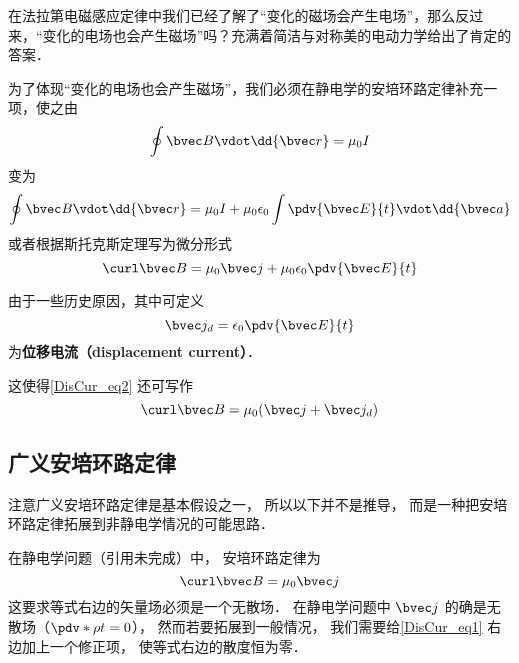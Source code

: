 
\begin{issues}
\issueDraft
\end{issues}


在法拉第电磁感应定律中我们已经了解了“变化的磁场会产生电场”，那么反过来，“变化的电场也会产生磁场”吗？充满着简洁与对称美的电动力学给出了肯定的答案．

为了体现“变化的电场也会产生磁场”，我们必须在静电学的安培环路定律补充一项，使之由
\begin{equation}
\oint \bvec B \vdot \dd{\bvec r} = \mu_0 I
\end{equation}
变为
\begin{equation}
\oint \bvec B \vdot \dd{\bvec r} = \mu_0 I + \mu_0 \epsilon_0 \int \pdv{\bvec E}{t} \vdot \dd{\bvec a}
\end{equation}
或者根据斯托克斯定理写为微分形式
\begin{equation}\label{DisCur_eq2}
\curl \bvec B = \mu_0 \bvec j + \mu_0\epsilon_0 \pdv{\bvec E}{t}
\end{equation}

由于一些历史原因，其中可定义
\begin{equation}
\bvec j_d = \epsilon_0 \pdv{\bvec E}{t}
\end{equation}
为\textbf{位移电流（displacement current）}．

这使得\autoref{DisCur_eq2} 还可写作
\begin{equation}
\curl \bvec B = \mu_0 (\bvec j + \bvec j_d)
\end{equation}

\subsection{广义安培环路定律}

注意广义安培环路定律是基本假设之一， 所以以下并不是推导， 而是一种把安培环路定律拓展到非静电学情况的可能思路．

在静电学问题（引用未完成）中， 安培环路定律为
\begin{equation}\label{DisCur_eq1}
\curl\bvec B = \mu_0\bvec j
\end{equation}
这要求等式右边的矢量场必须是一个无散场． 在静电学问题中 $\bvec j$ 的确是无散场（$\pdv*{\rho}{t} = 0$）， 然而若要拓展到一般情况， 我们需要给\autoref{DisCur_eq1} 右边加上一个修正项， 使等式右边的散度恒为零．

